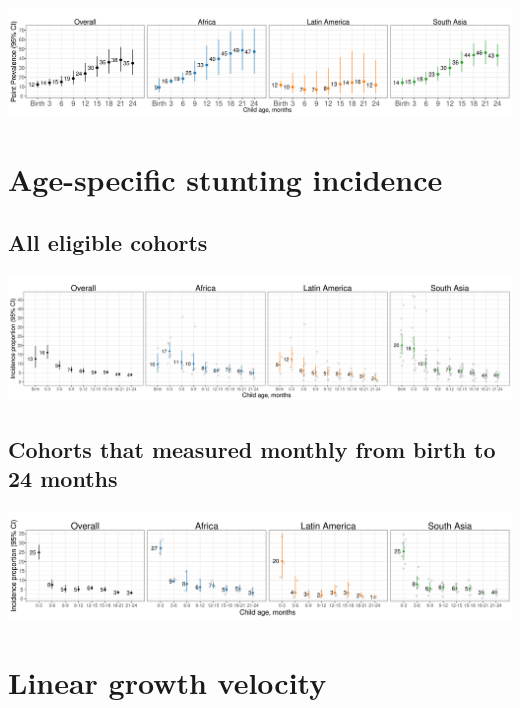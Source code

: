 \documentclass[
  9pt,
]{book}
\begin{document}
\includegraphics[width=58.33in]{figures//stunting/fig-stunt-2-prev-overall_region--allage-month24}

\hypertarget{age-specific-stunting-incidence}{%
\section{Age-specific stunting incidence}\label{age-specific-stunting-incidence}}

\hypertarget{all-eligible-cohorts-2}{%
\subsection{All eligible cohorts}\label{all-eligible-cohorts-2}}

\includegraphics[width=66.67in]{figures//stunting/fig-stunt-2-inc-overall_region--allage-primary}

\hypertarget{cohorts-that-measured-monthly-from-birth-to-24-months-2}{%
\subsection{Cohorts that measured monthly from birth to 24 months}\label{cohorts-that-measured-monthly-from-birth-to-24-months-2}}

\includegraphics[width=58.33in]{figures//stunting/fig-stunt-2-inc-overall_region--allage-month24}

\hypertarget{linear-growth-velocity}{%
\section{Linear growth velocity}\label{linear-growth-velocity}}
\end{document}
